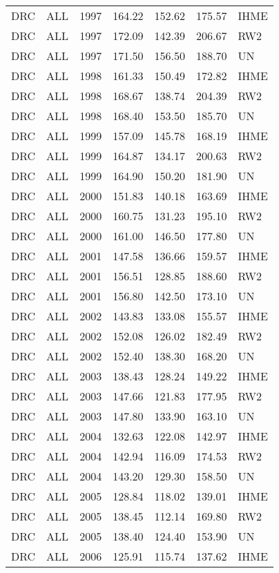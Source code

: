 \begin{longtable}{lllrrrl}
  DRC & ALL & 1997 & 164.22 & 152.62 & 175.57 & IHME \\ 
  DRC & ALL & 1997 & 172.09 & 142.39 & 206.67 & RW2 \\ 
  DRC & ALL & 1997 & 171.50 & 156.50 & 188.70 & UN \\ 
  DRC & ALL & 1998 & 161.33 & 150.49 & 172.82 & IHME \\ 
  DRC & ALL & 1998 & 168.67 & 138.74 & 204.39 & RW2 \\ 
  DRC & ALL & 1998 & 168.40 & 153.50 & 185.70 & UN \\ 
  DRC & ALL & 1999 & 157.09 & 145.78 & 168.19 & IHME \\ 
  DRC & ALL & 1999 & 164.87 & 134.17 & 200.63 & RW2 \\ 
  DRC & ALL & 1999 & 164.90 & 150.20 & 181.90 & UN \\ 
  DRC & ALL & 2000 & 151.83 & 140.18 & 163.69 & IHME \\ 
  DRC & ALL & 2000 & 160.75 & 131.23 & 195.10 & RW2 \\ 
  DRC & ALL & 2000 & 161.00 & 146.50 & 177.80 & UN \\ 
  DRC & ALL & 2001 & 147.58 & 136.66 & 159.57 & IHME \\ 
  DRC & ALL & 2001 & 156.51 & 128.85 & 188.60 & RW2 \\ 
  DRC & ALL & 2001 & 156.80 & 142.50 & 173.10 & UN \\ 
  DRC & ALL & 2002 & 143.83 & 133.08 & 155.57 & IHME \\ 
  DRC & ALL & 2002 & 152.08 & 126.02 & 182.49 & RW2 \\ 
  DRC & ALL & 2002 & 152.40 & 138.30 & 168.20 & UN \\ 
  DRC & ALL & 2003 & 138.43 & 128.24 & 149.22 & IHME \\ 
  DRC & ALL & 2003 & 147.66 & 121.83 & 177.95 & RW2 \\ 
  DRC & ALL & 2003 & 147.80 & 133.90 & 163.10 & UN \\ 
  DRC & ALL & 2004 & 132.63 & 122.08 & 142.97 & IHME \\ 
  DRC & ALL & 2004 & 142.94 & 116.09 & 174.53 & RW2 \\ 
  DRC & ALL & 2004 & 143.20 & 129.30 & 158.50 & UN \\ 
  DRC & ALL & 2005 & 128.84 & 118.02 & 139.01 & IHME \\ 
  DRC & ALL & 2005 & 138.45 & 112.14 & 169.80 & RW2 \\ 
  DRC & ALL & 2005 & 138.40 & 124.40 & 153.90 & UN \\ 
  DRC & ALL & 2006 & 125.91 & 115.74 & 137.62 & IHME \\ 

\end{longtable}
